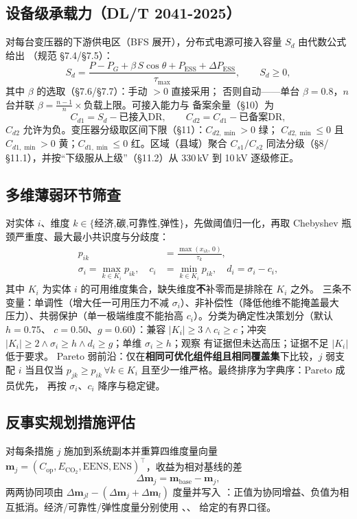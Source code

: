 \documentclass[UTF8,fontset=fandol,a4paper,11pt]{ctexart}
\begin{document}
\subsection{设备级承载力（DL/T 2041-2025）}
对每台变压器的下游供电区（BFS 展开），分布式电源可接入容量 $S_d$ 由代数公式给出
（规范 §7.4/§7.5）：
\begin{equation}
S_d = \frac{P - P_G + \beta\,S\cos\theta + P_{\text{ESS}} + \Delta P_{\text{ESS}}}{\tau_{\max}},
\qquad S_d \ge 0,
\end{equation}
其中 $\beta$ 的选取（§7.6/§7.7）：手动 $>0$ 直接采用；
否则自动——单台 $\beta=0.8$，$n$ 台并联 $\beta=\frac{n-1}{n}\times$负载上限。可接入能力与
备案余量（§10）为
\begin{equation}
C_{d1}=S_d-\text{已接入DR},\qquad C_{d2}=C_{d1}-\text{已备案DR},
\end{equation}
$C_{d2}$ 允许为负。变压器分级取区间下限（§11）：$C_{d2,\min}>0$ 绿；
$C_{d2,\min}\le 0$ 且 $C_{d1,\min}>0$ 黄；$C_{d1,\min}\le 0$ 红。区域（县域）聚合
$C_{s1}/C_{s2}$ 同法分级（§8/§11.1），并按“下级服从上级”（§11.2）从 330\,kV 到 10\,kV
逐级修正。

\subsection{多维薄弱环节筛查}
对实体 $i$、维度 $k\in\{$经济,碳,可靠性,弹性$\}$，先做阈值归一化，再取 Chebyshev
瓶颈严重度、最大最小共识度与分歧度：
\begin{align}
p_{ik} &= \frac{\max(x_{ik},\,0)}{\tau_k}, \\
\sigma_i = \max_{k\in K_i} p_{ik}, \quad
c_i &= \min_{k\in K_i} p_{ik}, \quad
d_i = \sigma_i - c_i,
\end{align}
其中 $K_i$ 为实体 $i$ 的可用维度集合，缺失维度\textbf{不}补零而是排除在 $K_i$ 之外。
三条不变量：单调性（增大任一可用压力不减 $\sigma_i$）、非补偿性（降低他维不能掩盖最大
压力）、共弱保护（单一极端维度不能抬高 $c_i$）。分类为确定性决策划分（默认 $h=0.75$、
$c=0.50$、$g=0.60$）：兼容 $|K_i|\ge3\wedge c_i\ge c$；冲突 $|K_i|\ge2\wedge\sigma_i\ge
h\wedge d_i\ge g$；单维 $\sigma_i\ge h$；观察 有证据但未达高压；证据不足 $|K_i|$ 低于要求。
Pareto 弱前沿：仅在\textbf{相同可优化组件组且相同覆盖集}下比较，$j$ 弱支配 $i$ 当且仅当
$p_{jk}\ge p_{ik}\,\forall k\in K_i$ 且至少一维严格。最终排序为字典序：Pareto 成员优先，
再按 $\sigma_i$、$c_i$ 降序与稳定键。

\subsection{反事实规划措施评估}
对每条措施 $j$ 施加到系统副本并重算四维度量向量
$\mathbf{m}_j=(C_{\text{op}},E_{\mathrm{CO_2}},\text{EENS},\text{ENS})^\top$，收益为相对基线的差
\begin{equation}
\Delta\mathbf{m}_j = \mathbf{m}_{\text{base}} - \mathbf{m}_j,
\end{equation}
两两协同项由 $\Delta\mathbf{m}_{jl} - (\Delta\mathbf{m}_j + \Delta\mathbf{m}_l)$ 度量并写入
：正值为协同增益、负值为相互抵消。经济/可靠性/弹性度量分别使用
、、
 给定的有界口径。
\end{document}
